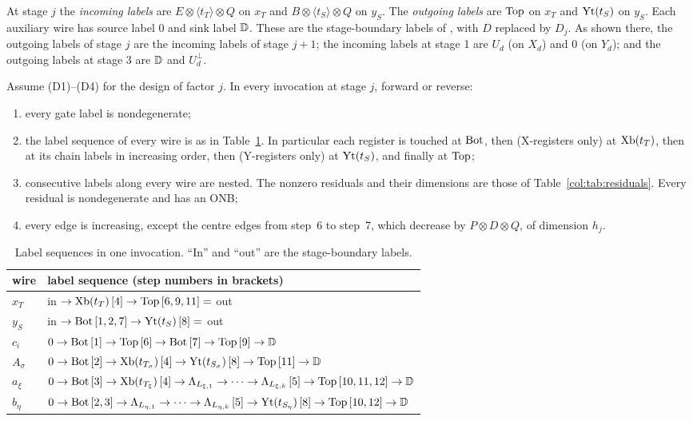 At stage $j$ the \emph{incoming labels} are $E\otimes\langle t_T\rangle\otimes Q$ on $x_T$ and
$B\otimes\langle t_S\rangle\otimes Q$ on $y_S$. The \emph{outgoing labels} are $\mathrm{Top}$ on $x_T$ and
$\mathrm{Yt}(t_S)$ on $y_S$. Each auxiliary wire has source label $0$ and sink label $\mathbb{D}$. These are the
stage-boundary labels of \cite[\S2.3]{oai}, with $D$ replaced by $D_j$. As shown there, the outgoing
labels of stage $j$ are the incoming labels of stage $j+1$; the incoming labels at stage 1 are $U_d$
(on $X_d$) and $0$ (on $Y_d$); and the outgoing labels at stage 3 are $\mathbb{D}$ and $U_d^\perp$.

\begin{lemma}\label{col:lem:edges}
Assume (D1)--(D4) for the design of factor $j$. In every invocation at stage $j$, forward or reverse:
\begin{enumerate}
\item[(a)] every gate label is nondegenerate;
\item[(b)] the label sequence of every wire is as in Table~\ref{col:tab:paths}. In particular each
  register is touched at $\mathrm{Bot}$, then (X-registers only) at $\mathrm{Xb}(t_T)$, then at its chain labels in
  increasing order, then (Y-registers only) at $\mathrm{Yt}(t_S)$, and finally at $\mathrm{Top}$;
\item[(c)] consecutive labels along every wire are nested. The nonzero residuals and their dimensions are
  those of Table~\ref{col:tab:residuals}. Every residual is nondegenerate and has an ONB;
\item[(d)] every edge is increasing, except the centre edges from step~6 to step~7, which decrease by
  $P\otimes D\otimes Q$, of dimension $h_j$.
\end{enumerate}
\end{lemma}

\begin{table}[ht]\centering\small
\begin{tabular}{@{}l l@{}}
\toprule
wire & label sequence (step numbers in brackets)\\
\midrule
$x_T$ & in $\to\mathrm{Xb}(t_T)\,[4]\to\mathrm{Top}\,[6,9,11]=$ out\\
$y_S$ & in $\to\mathrm{Bot}\,[1,2,7]\to\mathrm{Yt}(t_S)\,[8]=$ out\\
$c_i$ & $0\to\mathrm{Bot}\,[1]\to\mathrm{Top}\,[6]\to\mathrm{Bot}\,[7]\to\mathrm{Top}\,[9]\to\mathbb{D}$\\
$A_\sigma$ & $0\to\mathrm{Bot}\,[2]\to\mathrm{Xb}(t_{T_\sigma})\,[4]\to\mathrm{Yt}(t_{S_\sigma})\,[8]\to\mathrm{Top}\,[11]\to\mathbb{D}$\\
$a_\xi$ & $0\to\mathrm{Bot}\,[3]\to\mathrm{Xb}(t_{T_\xi})\,[4]\to\Lambda_{L_{\xi,1}}\to\dots\to\Lambda_{L_{\xi,k}}\,[5]\to\mathrm{Top}\,[10,11,12]\to\mathbb{D}$\\
$b_\eta$ & $0\to\mathrm{Bot}\,[2,3]\to\Lambda_{L_{\eta,1}}\to\dots\to\Lambda_{L_{\eta,k}}\,[5]\to\mathrm{Yt}(t_{S_\eta})\,[8]\to\mathrm{Top}\,[10,12]\to\mathbb{D}$\\
\bottomrule
\end{tabular}
\caption{Label sequences in one invocation. ``In'' and ``out'' are the stage-boundary
labels.}\label{col:tab:paths}
\end{table}

